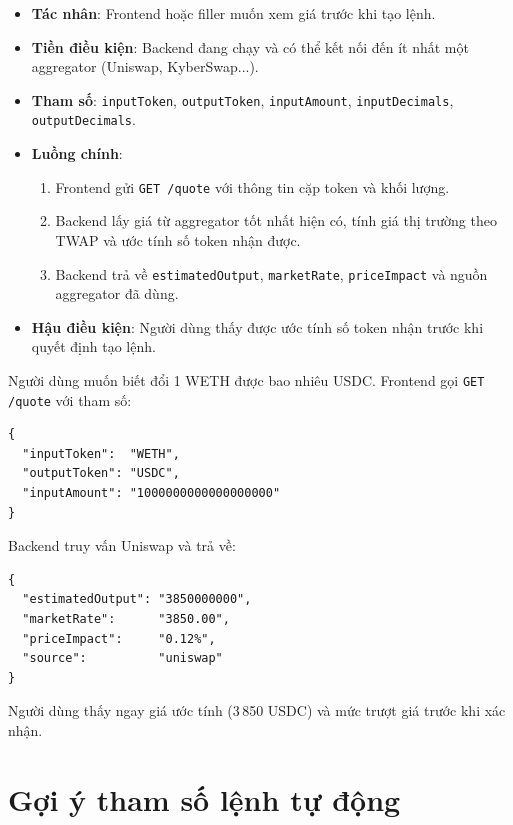 \documentclass[../DoAn.tex]{subfiles}
\begin{document}
\begin{itemize}
    \item \textbf{Tác nhân}: Frontend hoặc filler muốn xem giá trước khi tạo lệnh.
    \item \textbf{Tiền điều kiện}: Backend đang chạy và có thể kết nối đến ít nhất một aggregator (Uniswap, KyberSwap...).
    \item \textbf{Tham số}: \texttt{inputToken}, \texttt{outputToken}, \texttt{inputAmount}, \texttt{inputDecimals}, \texttt{outputDecimals}.
    \item \textbf{Luồng chính}:
    \begin{enumerate}
        \item Frontend gửi \texttt{GET /quote} với thông tin cặp token và khối lượng.
        \item Backend lấy giá từ aggregator tốt nhất hiện có, tính giá thị trường theo TWAP và ước tính số token nhận được.
        \item Backend trả về \texttt{estimatedOutput}, \texttt{marketRate}, \texttt{priceImpact} và nguồn aggregator đã dùng.
    \end{enumerate}
    \item \textbf{Hậu điều kiện}: Người dùng thấy được ước tính số token nhận trước khi quyết định tạo lệnh.
\end{itemize}

\begin{example}
Người dùng muốn biết đổi 1 WETH được bao nhiêu USDC. Frontend gọi \texttt{GET /quote} với tham số:
\begin{lstlisting}[numbers=none]
{
  "inputToken":  "WETH",
  "outputToken": "USDC",
  "inputAmount": "1000000000000000000"
}
\end{lstlisting}
Backend truy vấn Uniswap và trả về:
\begin{lstlisting}[numbers=none]
{
  "estimatedOutput": "3850000000",
  "marketRate":      "3850.00",
  "priceImpact":     "0.12%",
  "source":          "uniswap"
}
\end{lstlisting}
Người dùng thấy ngay giá ước tính (3\,850 USDC) và mức trượt giá trước khi xác nhận.
\end{example}

\section{Gợi ý tham số lệnh tự động}
\end{document}
